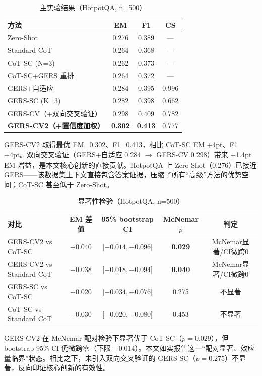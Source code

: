 \documentclass[11pt,a4paper]{ctexart}
\begin{document}
\begin{table}[h]
\centering
\caption{主实验结果（HotpotQA, n=500）}
\begin{tabular}{lccc}
\toprule
方法 & EM & F1 & CS \\
\midrule
Zero-Shot & 0.276 & 0.389 & — \\
Standard CoT & 0.264 & 0.368 & — \\
CoT-SC (N=3) & 0.262 & 0.373 & — \\
CoT-SC+GERS 重排 & 0.264 & 0.372 & — \\
GERS+自适应 & 0.284 & 0.395 & 0.996 \\
GERS-SC (K=3) & 0.282 & 0.398 & 0.662 \\
GERS-CV（+双向交叉验证） & 0.298 & 0.409 & 0.782 \\
\textbf{GERS-CV2（+置信度加权）} & \textbf{0.302} & \textbf{0.413} & 0.777 \\
\bottomrule
\end{tabular}
\end{table}

GERS-CV2 取得最优 EM=0.302、F1=0.413，相比 CoT-SC EM +4pt、F1 +4pt。双向交叉验证（GERS+自适应 0.284 $\to$ GERS-CV 0.298）带来 +1.4pt EM 增益，是本文核心创新的直接贡献。HotpotQA 上 Zero-Shot（0.276）已接近 GERS——该数据集上下文直接包含答案证据，压缩了所有``高级''方法的优势空间；CoT-SC 甚至低于 Zero-Shot。

\begin{table}[h]
\centering
\caption{显著性检验（HotpotQA, n=500）}
\begin{tabular}{lcccc}
\toprule
对比 & EM 差值 & 95\% bootstrap CI & McNemar $p$ & 判定 \\
\midrule
GERS-CV2 vs CoT-SC & +0.040 & [$-0.014, +0.096$] & \textbf{0.029} & McNemar显著/CI微跨0 \\
GERS-CV2 vs Standard CoT & +0.038 & [$-0.018, +0.094$] & \textbf{0.040} & McNemar显著/CI微跨0 \\
GERS-SC vs CoT-SC & +0.020 & [$-0.034, +0.076$] & 0.275 & 不显著 \\
CoT-SC vs Standard CoT & +0.030 & [$-0.020, +0.080$] & 0.453 & 不显著 \\
\bottomrule
\end{tabular}
\end{table}

GERS-CV2 在 McNemar 配对检验下显著优于 CoT-SC（$p=0.029$），但 bootstrap 95\% CI 仍微跨零（下限 $-0.014$）。本文如实报告这一``配对显著、效应量临界''状态。相比之下，未引入双向交叉验证的 GERS-SC（$p=0.275$）不显著，反向印证核心创新的有效性。
\end{document}
